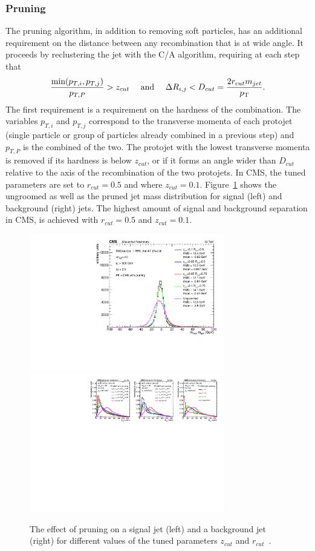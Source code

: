 \subsubsection{Pruning}
\label{sec:objreco:pruning}
The pruning algorithm, in addition to removing soft particles, has an additional requirement on the distance between any recombination that is at wide angle.
It proceeds by reclustering the jet with the C/A algorithm, requiring at each step that
\begin{equation}
  \label{eq:pruning}
\frac{ \textrm{min}(p_{T,i},p_{T,j}) }{ p_{T,P} } > z_{cut} \quad \textrm{ and } \quad \Delta R_{i,j} < D_{cut} = \frac{2 r_{cut} m_{jet}}{p_{\mathrm{T}}}.
\end{equation}
The first requirement is a requirement on the hardness of the combination. The variables $p_{T,i}$ and $p_{T,j}$ correspond to the transverse momenta of each protojet (single particle or group of particles already combined in a previous step) and $p_{T,P}$ is the combined \PT of the two. The protojet with the lowest transverse momenta is removed if its hardness is below $z_{cut}$, or if it forms an angle wider than $D_{cut}$ relative to the axis of the recombination of the two protojets. In CMS, the tuned parameters are set to $r_{cut}=0.5$ and where $z_{cut}=0.1$. Figure~\ref{fig:objreco:pruning} shows the ungroomed as well as the pruned jet mass distribution for signal (left) and background (right) jets. The highest amount of signal and background separation in CMS, is achieved with $r_{cut}=0.5$ and $z_{cut}=0.1$.
\begin{figure}[h!] 
    \centering
    \includegraphics[height=6cm]{figures/event_reconstruction/sig_pruning.pdf}
    \includegraphics[height=6cm]{figures/event_reconstruction/bkg_pruning-noData.pdf}
    \caption{The effect of pruning on a signal jet (left) and a background jet (right) for different values of the tuned parameters $z_{cut}$ and $r_{cut}$~\cite{CMS-PAS-JME-14-001}.}
    \label{fig:objreco:pruning}
\end{figure}

